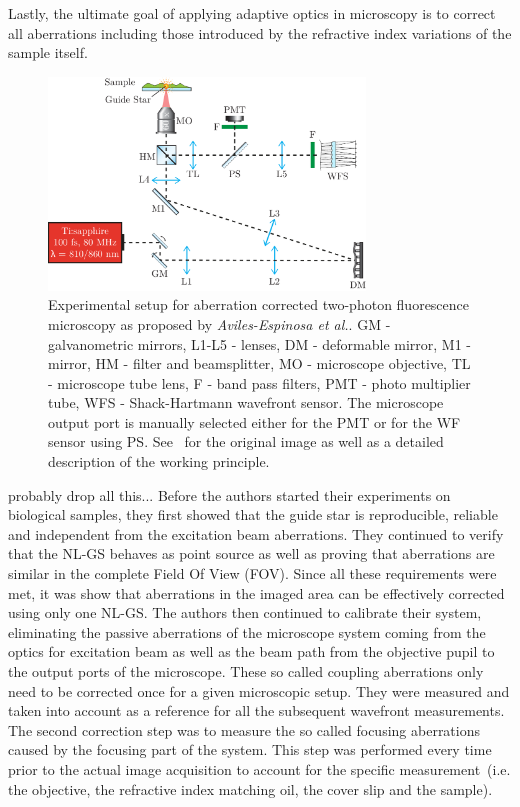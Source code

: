 Lastly, the ultimate goal of applying adaptive optics in microscopy is to 
correct all aberrations including those introduced by the refractive index 
variations of the sample itself.
\cite{wide_AOM_FM_spehrical_correction}


\begin{figure}
	\centering
		\includegraphics[width=0.75\textwidth]{images/TPFM_guide-star}
	\caption{Experimental setup for aberration corrected two-photon fluorescence microscopy as proposed by \emph{Aviles-Espinosa et al.}. GM - galvanometric mirrors, L1-L5 - lenses, DM - deformable mirror, M1 - mirror, HM - filter and beamsplitter, MO - microscope objective, TL - microscope tube lens, F - band pass filters, PMT - photo multiplier tube, WFS - Shack-Hartmann wavefront sensor. The microscope output port is manually selected either for the PMT or for the WF sensor using PS. See~\cite{scan_TPFM_guide_start} for the original image as well as a detailed description of the working principle.}
	\label{fig:TPFM_guide-star}
\end{figure}
%
probably drop all this...
Before the authors started their experiments on biological samples, they first showed that the guide star is reproducible, reliable and independent from the excitation beam aberrations. They continued to verify that the NL-GS behaves as point source as well as proving that aberrations are similar in the complete Field Of View (FOV). Since all these requirements were met, it was show that aberrations in the imaged area can be effectively corrected using only one NL-GS. The authors then continued to calibrate their system, eliminating the passive aberrations of the microscope system coming from the optics for excitation beam as well as the beam path from the objective pupil to the output ports of the microscope. These so called coupling aberrations only need to be corrected once for a given microscopic setup. They were measured and taken into account as a reference for all the subsequent wavefront measurements. The second correction step was to measure the so called focusing aberrations caused by the focusing part of the system. This step was performed every time prior to the actual image acquisition to account for the specific measurement~(i.e. the objective, the refractive index matching oil, the cover slip and the sample).\newline

